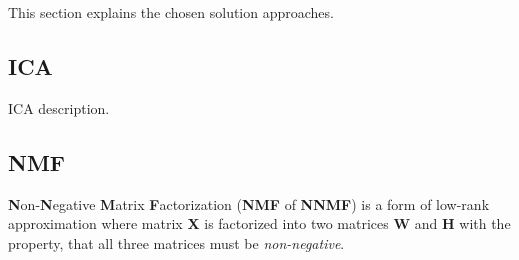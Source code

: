\documentclass[../main.tex]{subfiles} %
\begin{document}
This section explains the chosen solution approaches.

\subsection{ICA}

ICA description.

\subsection{NMF}

\textbf{N}on-\textbf{N}egative \textbf{M}atrix \textbf{F}actorization (\textbf{NMF} of \textbf{NNMF}) is a form of low-rank approximation where matrix \textbf{X} is factorized into two matrices \textbf{W} and \textbf{H} with the property, that all three matrices must be \textit{non-negative}.
\end{document}
